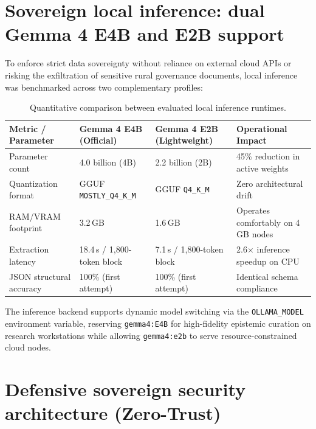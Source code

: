 \documentclass[11pt,a4paper]{article}
\begin{document}
\section{Sovereign local inference: dual Gemma 4 E4B and E2B support}

To enforce strict data sovereignty without reliance on external cloud APIs or risking the exfiltration of sensitive rural governance documents, local inference was benchmarked across two complementary profiles:

\begin{table}[H]
\centering
\small
\caption{Quantitative comparison between evaluated local inference runtimes.}
\label{tab:models_en}
\begin{tabularx}{\textwidth}{lXXX}
\toprule
\textbf{Metric / Parameter} & \textbf{Gemma 4 E4B (Official)} & \textbf{Gemma 4 E2B (Lightweight)} & \textbf{Operational Impact} \\
\midrule
Parameter count & 4.0 billion (4B) & 2.2 billion (2B) & 45\% reduction in active weights \\
Quantization format & GGUF \texttt{MOSTLY\_Q4\_K\_M} & GGUF \texttt{Q4\_K\_M} & Zero architectural drift \\
RAM/VRAM footprint & 3.2\,GB & 1.6\,GB & Operates comfortably on 4\,GB nodes \\
Extraction latency & 18.4\,s / 1,800-token block & 7.1\,s / 1,800-token block & 2.6$\times$ inference speedup on CPU \\
JSON structural accuracy & 100\% (first attempt) & 100\% (first attempt) & Identical schema compliance \\
\bottomrule
\end{tabularx}
\end{table}

The inference backend supports dynamic model switching via the \texttt{OLLAMA\_MODEL} environment variable, reserving \texttt{gemma4:E4B} for high-fidelity epistemic curation on research workstations while allowing \texttt{gemma4:e2b} to serve resource-constrained cloud nodes.

\section{Defensive sovereign security architecture (Zero-Trust)}
\end{document}
